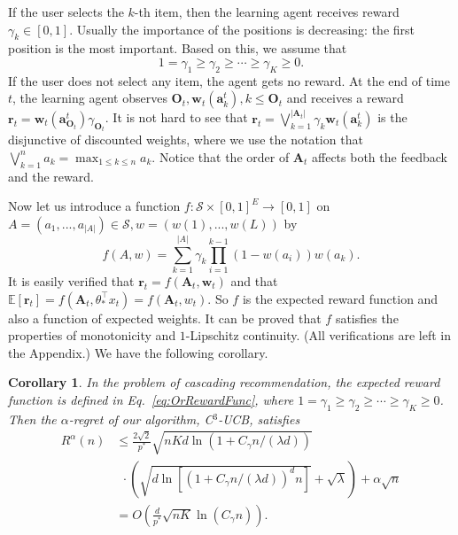 \documentclass{article}
\newcommand{\EE}{\mathbb{E}}
\newcommand{\bA}{\mathbf{A}}
\newcommand{\ba}{\mathbf{a}}
\newcommand{\bO}{\mathbf{O}}
\newcommand{\br}{\mathbf{r}}
\newcommand{\bw}{\mathbf{w}}
\newcommand{\cO}{\mathcal{O}}
\newcommand{\cS}{\mathcal{S}}
\newcommand{\abs}[1]{\left| #1 \right|}
\newtheorem{corollary}[theorem]{Corollary}%
\begin{document}
If the user selects the $k$-th item, then the learning agent receives reward $\gamma_k \in [0,1]$. Usually the importance of the positions is decreasing: the first position is the most important. Based on this, we assume that
$$
1 = \gamma_1 \geq \gamma_2 \geq \cdots \geq \gamma_K \geq 0.
$$
If the user does not select any item, the agent gets no reward. At the end of time $t$, the learning agent observes $\bO_t, \bw_t(\ba_k^t), k \leq \bO_t$ and receives a reward
$\br_t = \bw_t(\ba_{\bO_t}^t) \gamma_{\bO_t}$. It is not hard to see that $\br_t = \bigvee_{k=1}^{\abs{\bA_t}} \gamma_k \bw_t(\ba_k^t)$ is the disjunctive of discounted weights,
where we use the notation that $\bigvee_{k=1}^n a_k = \max_{1 \leq k \leq n} a_k$. Notice that the order of $\bA_t$ affects both the feedback and the reward.

Now let us introduce a function $f: \cS \times [0,1]^E \to [0,1]$ on $A = (a_1,...,a_{\abs{A}}) \in \cS, w = (w(1),...,w(L))$ by
\begin{equation}
\label{eq:OrRewardFunc}
f(A,w) = \sum_{k = 1}^{\abs{A}} \gamma_{k} \prod_{i=1}^{k-1} (1 - w(a_i)) w(a_k). 
\end{equation}
It is easily verified that $\br_t = f(\bA_t, \bw_t)$ and that $\EE[\br_t] = f(\bA_t, \theta_{\ast}^{\top}x_t) = f(\bA_t, w_t)$. So $f$ is the expected reward function and also a function of expected weights. It can be proved that $f$ satisfies the properties of monotonicity and $1$-Lipschitz continuity. (All verifications are left in the Appendix.) 
We have the following corollary.
\begin{corollary}
	\label{cor:or}
	In the problem of cascading recommendation, the expected reward function is defined in Eq.~\eqref{eq:OrRewardFunc}, where $1 = \gamma_1 \geq \gamma_2 \geq \cdots \geq \gamma_K \geq 0$. Then the $\alpha$-regret of our algorithm, C$^3$-UCB, satisfies
	\begin{align}
		R^{\alpha}(n) &\le \frac{2\sqrt{2}}{p^*} \sqrt{nKd\ln(1 + C_\gamma n/(\lambda d))}  \nonumber \\
		&~~ \cdot \left(\sqrt{d\ln[(1 + C_\gamma n/(\lambda d))^d n]} + \sqrt{\lambda}\right) + \alpha \sqrt{n}\nonumber \\
		&=O\left(\frac{d}{p^*} \sqrt{nK} \ln (C_\gamma n) \right).
	\end{align}
\end{corollary}
\end{document}
